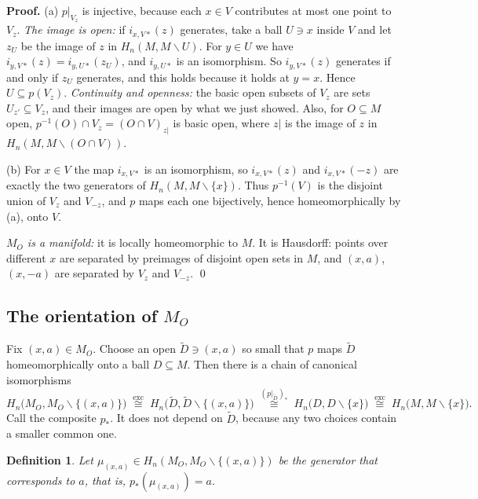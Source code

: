 \documentclass[11pt]{article}
\newcommand{\MO}{M_O}
\newcommand{\minus}{\smallsetminus}
\newcommand{\iso}{\cong}
\theoremstyle{namedit}
\theoremstyle{namedrm}
\newtheorem{defn}{Definition}
\begin{document}
\begin{filled}
\textbf{Proof.}
(a) $p|_{V_z}$ is injective, because each $x\in V$ contributes at most one point to $V_z$.
\emph{The image is open:} if $i_{x,V*}(z)$ generates, take a ball $U\ni x$ inside $V$ and let $z_U$ be
the image of $z$ in $H_n(M,M\minus U)$. For $y\in U$ we have $i_{y,V*}(z)=i_{y,U*}(z_U)$, and $i_{y,U*}$ is
an isomorphism. So $i_{y,V*}(z)$ generates if and only if $z_U$ generates, and this holds because it
holds at $y=x$. Hence $U\subseteq p(V_z)$.
\emph{Continuity and openness:} the basic open subsets of $V_z$ are sets $U_{z'}\subseteq V_z$, and their
images are open by what we just showed. Also, for $O\subseteq M$ open,
$p^{-1}(O)\cap V_z=(O\cap V)_{z|}$ is basic open, where $z|$ is the image of $z$ in
$H_n(M,M\minus(O\cap V))$.

(b) For $x\in V$ the map $i_{x,V*}$ is an isomorphism, so $i_{x,V*}(z)$ and $i_{x,V*}(-z)$ are exactly the two
generators of $H_n(M,M\minus\{x\})$. Thus $p^{-1}(V)$ is the disjoint union of $V_z$ and $V_{-z}$, and
$p$ maps each one bijectively, hence homeomorphically by (a), onto $V$.

\emph{$\MO$ is a manifold:} it is locally homeomorphic to $M$. It is Hausdorff: points over different
$x$ are separated by preimages of disjoint open sets in $M$, and $(x,a)$, $(x,-a)$ are separated by
$V_z$ and $V_{-z}$. \qed
\end{filled}

\subsection{The orientation of \texorpdfstring{$\MO$}{M\_O}}

Fix $(x,a)\in\MO$. Choose an open $\widetilde D\ni(x,a)$ so small that $p$ maps $\widetilde D$
homeomorphically onto a ball $D\subseteq M$. Then there is a chain of canonical isomorphisms
\[
  H_n\bigl(\MO,\MO\minus\{(x,a)\}\bigr)
  \;\overset{\text{exc}}{\iso}\;
  H_n\bigl(\widetilde D,\widetilde D\minus\{(x,a)\}\bigr)
  \;\overset{(p|_{\widetilde D})_*}{\iso}\;
  H_n\bigl(D,D\minus\{x\}\bigr)
  \;\overset{\text{exc}}{\iso}\;
  H_n\bigl(M,M\minus\{x\}\bigr).
\]
Call the composite $p_*$. It does not depend on $\widetilde D$, because any two choices contain a
smaller common one.

\begin{defn}
Let $\mu_{(x,a)}\in H_n(\MO,\MO\minus\{(x,a)\})$ be the generator that corresponds to $a$, that is,
$p_*(\mu_{(x,a)})=a$.
\end{defn}
\end{document}

